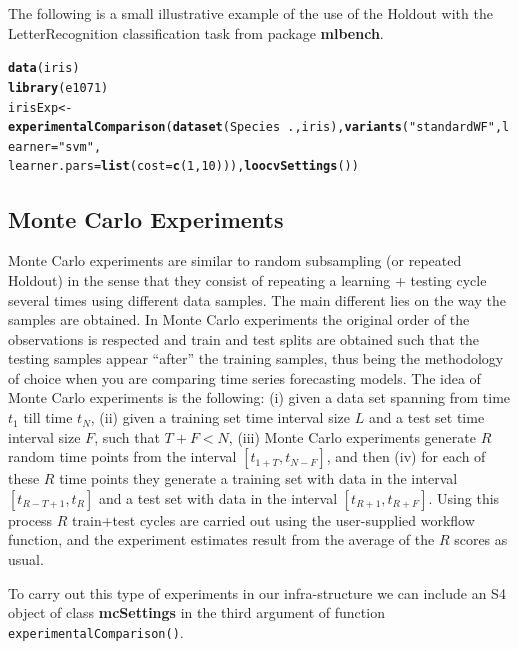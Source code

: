 \documentclass[10pt,a4paper]{article}\usepackage[]{graphicx}\usepackage[]{color}
\makeatletter
\newcommand{\hlnum}[1]{\textcolor[rgb]{0.686,0.059,0.569}{#1}}%
\newcommand{\hlstr}[1]{\textcolor[rgb]{0.192,0.494,0.8}{#1}}%
\newcommand{\hlopt}[1]{\textcolor[rgb]{0,0,0}{#1}}%
\newcommand{\hlstd}[1]{\textcolor[rgb]{0.345,0.345,0.345}{#1}}%
\newcommand{\hlkwb}[1]{\textcolor[rgb]{0.69,0.353,0.396}{#1}}%
\newcommand{\hlkwc}[1]{\textcolor[rgb]{0.333,0.667,0.333}{#1}}%
\newcommand{\hlkwd}[1]{\textcolor[rgb]{0.737,0.353,0.396}{\textbf{#1}}}%
\newenvironment{kframe}{%
 \def\at@end@of@kframe{}%
 \ifinner\ifhmode%
  \def\at@end@of@kframe{\end{minipage}}%
  \begin{minipage}{\columnwidth}%
 \fi\fi%
 \def\FrameCommand##1{\hskip\@totalleftmargin \hskip-\fboxsep
 \colorbox{shadecolor}{##1}\hskip-\fboxsep
     \hskip-\linewidth \hskip-\@totalleftmargin \hskip\columnwidth}%
 \MakeFramed {\advance\hsize-\width
   \@totalleftmargin\z@ \linewidth\hsize
   \@setminipage}}%
 {\par\unskip\endMakeFramed%
 \at@end@of@kframe}
\newenvironment{knitrout}{}{} %
\makeatother
\begin{document}
The following is a small illustrative example of the use of the
Holdout with the LetterRecognition classification task from package
\textbf{mlbench}.

\begin{knitrout}
\color{fgcolor}\begin{kframe}
\begin{alltt}
\hlkwd{data}\hlstd{(iris)}
\hlkwd{library}\hlstd{(e1071)}
\hlstd{irisExp} \hlkwb{<-} \hlkwd{experimentalComparison}\hlstd{(}\hlkwd{dataset}\hlstd{(Species} \hlopt{~} \hlstd{., iris),} \hlkwd{variants}\hlstd{(}\hlstr{"standardWF"}\hlstd{,} \hlkwc{learner} \hlstd{=} \hlstr{"svm"}\hlstd{,}
    \hlkwc{learner.pars} \hlstd{=} \hlkwd{list}\hlstd{(}\hlkwc{cost} \hlstd{=} \hlkwd{c}\hlstd{(}\hlnum{1}\hlstd{,} \hlnum{10}\hlstd{))),} \hlkwd{loocvSettings}\hlstd{())}
\end{alltt}
\end{kframe}
\end{knitrout}

\subsection{Monte Carlo Experiments}

Monte Carlo experiments are similar to random subsampling (or repeated
Holdout) in the sense that they consist of repeating a learning +
testing cycle several times using different data samples. The main
different lies on the way the samples are obtained. In Monte Carlo
experiments the original order of the observations is respected and
train and test splits are obtained such that the testing samples
appear ``after'' the training samples, thus being the methodology of
choice when you are comparing time series forecasting models. The idea
of Monte Carlo experiments is the following: (i) given a data set
spanning from time $t_1$ till time $t_N$, (ii) given a training set
time interval size $L$ and a test set time interval size $F$, such
that $T+F < N$, (iii) Monte Carlo experiments generate $R$ random time
points from the interval $[t_{1+T},t_{N-F}]$, and then (iv) for each
of these $R$ time points they generate a training set with data in the
interval $[t_{R-T+1},t_{R}]$ and a test set with data in the interval
$[t_{R+1},t_{R+F}]$. Using this process $R$ train+test cycles are
carried out using the user-supplied workflow function, and the
experiment estimates result from the average of the $R$ scores as
usual.

To carry out this type of experiments in our infra-structure we can
include an S4 object of class \textbf{mcSettings} in the third
argument of function \texttt{experimentalComparison()}.
\end{document}
